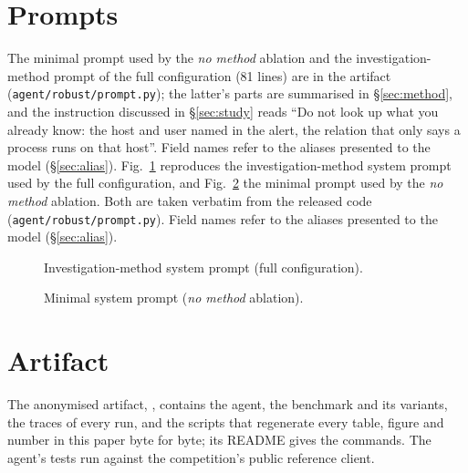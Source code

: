 \section{Prompts}
\label{app:prompts}
\ifconf
The minimal prompt used by the \emph{no method} ablation and the investigation-method
prompt of the full configuration (81 lines) are in the artifact (\texttt{agent/robust/prompt.py}); the latter's parts are
summarised in \S\ref{sec:method}, and the instruction discussed in \S\ref{sec:study} reads ``Do not look up
what you already know: the host and user named in the alert, the relation that only says a process runs on
that host''. Field names refer to the aliases presented to the model (\S\ref{sec:alias}).
\else
Fig.~\ref{fig:prompt} reproduces the investigation-method system prompt used by the full configuration, and
Fig.~\ref{fig:minprompt} the minimal prompt used by the \emph{no method} ablation. Both are taken verbatim from
the released code (\texttt{agent/robust/prompt.py}). Field names refer to the aliases presented to the model
(\S\ref{sec:alias}).

\begin{figure}[!t]
\centering
\begin{minipage}{0.92\textwidth}
\end{minipage}
\caption{Investigation-method system prompt (full configuration).}
\label{fig:prompt}
\end{figure}
\fi

\ifconf\else
\begin{figure}[!t]
\centering
\begin{minipage}{0.92\textwidth}
\end{minipage}
\caption{Minimal system prompt (\emph{no method} ablation).}
\label{fig:minprompt}
\end{figure}
\fi

\ifconf
\section{Artifact}
\label{app:repro}
The anonymised artifact, \ArtifactURL, contains the agent, the benchmark and its variants, the traces of
every run, and the scripts that regenerate every table, figure and number in this paper byte for byte; its
README gives the commands. The agent's tests run against the competition's public reference client.
\else

